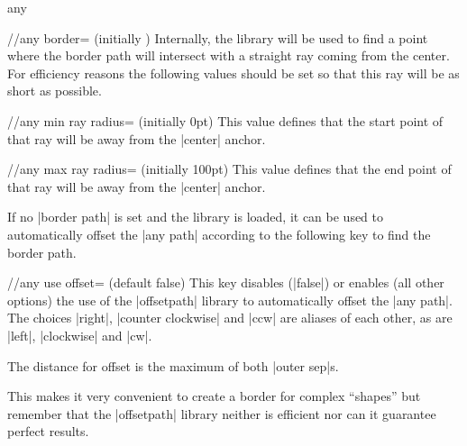 \begin{ext_shape}{any}
\begin{key}{/\pgfext/any border= (initially )}
    Internally, the  library will be used to
    find a point where the border path will intersect with a straight ray coming from the center.
    For efficiency reasons the following values should be set so that this ray will
    be as short as possible.
    \begin{key}{/\pgfext/any min ray radius= (initially 0pt)}
      This value defines that the start point of that ray will be  away from the |center| anchor.
    \end{key}
    \begin{key}{/\pgfext/any max ray radius= (initially 100pt)}
      This value defines that the end point of that ray will be  away from the |center| anchor.
    \end{key}
  \end{key}

  If no |border path| is set and the  library \cite{nfold}
  is loaded, it can be used to automatically offset the |any path| according to the following key to
  find the border path.
  \begin{key}{/\pgfext/any use offset= (default false)}
    This key disables (|false|) or enables (all other options) the use of the |offsetpath| library to
    automatically offset the |any path|.
    The choices |right|, |counter clockwise| and |ccw| are aliases of each other,
    as are |left|, |clockwise| and |cw|.
    
    The distance for offset is the maximum of both |outer sep|s.
    
    This makes it very convenient to create a border for complex \enquote{shapes} but
    remember that the |offsetpath| library neither is efficient nor can it guarantee perfect results.
\begin{codeexample}[preamble=\usepgflibrary{ext.shapes.any, offsetpath}]
\end{codeexample}
  \end{key}


\end{ext_shape}
